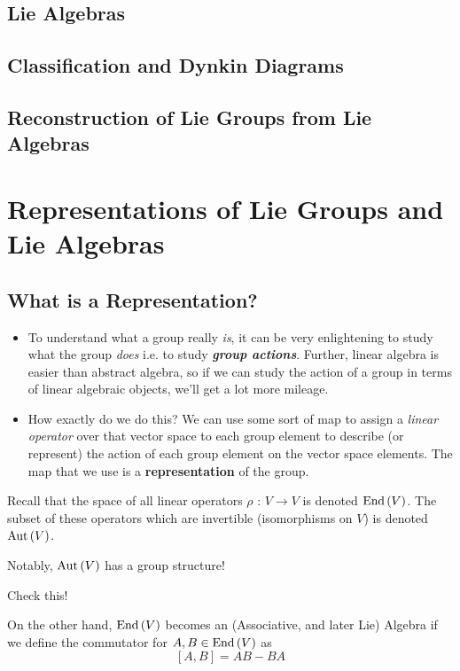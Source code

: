 \documentclass[11pt]{article}
\begin{document}
\subsection{Lie Algebras}

\subsection{Classification and Dynkin Diagrams}

\subsection{Reconstruction of Lie Groups from Lie Algebras}


\newpage
\section{Representations of Lie Groups and Lie Algebras}
\subsection{What is a Representation?}
\begin{itemize}
    \item To understand what a group really \emph{is}, it can be very enlightening to study what the group \emph{does} i.e. to study \emph{\textbf{group actions}}. Further, linear algebra is easier than abstract algebra, so if we can study the action of a group in terms of linear algebraic objects, we'll get a lot more mileage.
    \item How exactly do we do this? We can use some sort of map to assign a \emph{linear operator} over that vector space to each group element to describe (or represent) the action of each group element on the vector space elements. The map that we use is a \textbf{representation} of the group.
\end{itemize}

\vskip 0.5cm
\begin{redbox}
  Recall that the space of all linear operators $\rho \text{ : } V \rightarrow V$ is denoted $\mathrm{End}\left(V\right)$. The subset of these operators which are invertible (isomorphisms on $V$) is denoted $\mathrm{Aut}\left(V\right)$. 
  
  \vskip 0.5cm
  Notably, $\mathrm{Aut}\left(V\right)$ has a group structure! \begin{thought}{Check this!} \end{thought} On the other hand, $\mathrm{End}\left(V\right)$ becomes an (Associative, and later Lie) Algebra if we define the commutator for $A, B \in \mathrm{End}\left(V\right)$ as
  \[ [A, B] = AB - BA \] 
  
\end{redbox}
\end{document}
